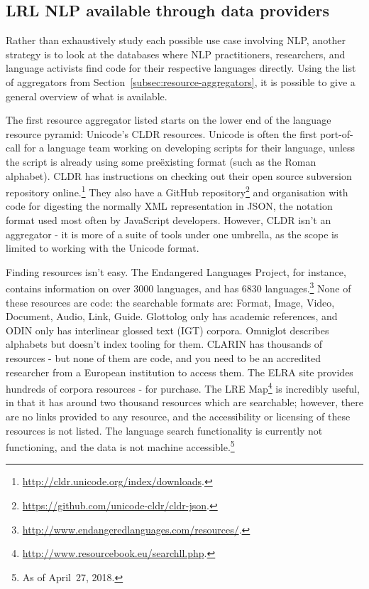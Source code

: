 \subsection{LRL NLP available through data providers}
\label{subsec:lrl-nlp-through-providers}

Rather than exhaustively study each possible use case involving NLP, another strategy is to look at the databases where NLP practitioners, researchers, and language activists find code for their respective languages directly. Using the list of aggregators from Section~\ref{subsec:resource-aggregators}, it is possible to give a general overview of what is available.

The first resource aggregator listed starts on the lower end of the language resource pyramid: Unicode's CLDR resources. Unicode is often the first port-of-call for a language team working on developing scripts for their language, unless the script is already using some  pre\"{e}xisting format (such as the Roman alphabet). CLDR has instructions on checking out their open source subversion repository online.\footnote{\href{http://cldr.unicode.org/index/downloads}{http://cldr.unicode.org/index/downloads}. } They also have a GitHub repository\footnote{\href{https://github.com/unicode-cldr/cldr-json}{https://github.com/unicode-cldr/cldr-json}. } and organisation with code for digesting the normally XML representation in JSON, the notation format used most often by JavaScript developers. However, CLDR isn't an aggregator - it is more of a suite of tools under one umbrella, as the scope is limited to working with the Unicode format.

Finding resources isn't easy. The Endangered Languages Project, for instance, contains information on over 3000 languages, and has 6830 languages.\footnote{\href{http://www.endangeredlanguages.com/resources/}{http://www.endangeredlanguages.com/resources/}. } None of these resources are code: the searchable formats are: Format, Image, Video, Document, Audio, Link, Guide. Glottolog only has academic references, and ODIN only has interlinear glossed text (IGT) corpora. Omniglot describes alphabets but doesn't index tooling for them. CLARIN has thousands of resources - but none of them are code, and you need to be an accredited researcher from a European institution to access them. The ELRA site provides hundreds of corpora resources - for purchase. The LRE Map\footnote{\href{http://www.resourcebook.eu/searchll.php}{http://www.resourcebook.eu/searchll.php}. } is incredibly useful, in that it has around two thousand resources which are searchable; however, there are no links provided to any resource, and the accessibility or licensing of these resources is not listed. The language search functionality is currently not functioning, and the data is not machine accessible.\footnote{As of April~27, 2018.}

